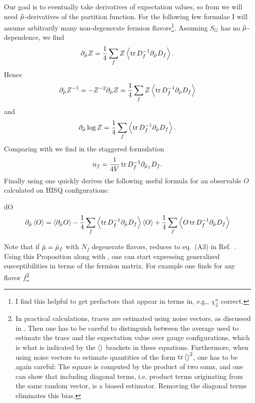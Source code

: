 Our goal is to eventually take derivatives of expectation values, so from
 we will need $\hat{\mu}$-derivatives of the partition 
function. For the following few formulae 
I will assume arbitrarily many non-degenerate
fermion flavors\footnote{I find this helpful to get prefactors that appear
in terms in, e.g., $\chi_2^u$ correct.}. Assuming $S_G$ has no 
$\hat{\mu}$-dependence, we find
\begin{equation}
  \partial_{\muh}Z = \frac{1}{4}\sum_f 
                      Z\ev{\tr D_f^{-1}\partial_{\muh}D_f}.
\end{equation}
Hence 
\begin{equation}\label{eq:dZinv}
  \partial_{\muh}Z^{-1} = -Z^{-2}\partial_{\muh}Z
                        =\frac{1}{4}\sum_fZ\ev{\tr D_f^{-1}\partial_{\muh}D_f}
\end{equation}
and
\begin{equation}\label{eq:dlogZ}
  \partial_{\muh}\log Z=\frac{1}{4}\sum_f\ev{\tr D_f^{-1}\partial_{\muh}D_f}.
\end{equation}
Comparing  with  we find in
the staggered formulation
\begin{equation}
  n_f=\frac{1}{4V}\tr D_f^{-1}\partial_{\hat{\mu}_f}D_f.
\end{equation} 
Finally using  one quickly derives the following useful formula
for an observable $O$ calculated on HISQ configurations:
\begin{proposition}{}{dO}
\begin{equation*} \partial_{\muh}\ev{O}
       =   \ev{\partial_{\muh}O}
        -\frac{1}{4}\sum_f\ev{\tr D_f^{-1}\partial_{\muh}D_f}\ev{O}
         +\frac{1}{4}\sum_f\ev{O\tr D_f^{-1}\partial_{\muh}D_f}
\end{equation*}
\end{proposition} 
Note that if $\hat{\mu}=\hat{\mu}_f$ with $N_f$ degenerate flavors, 
 reduces to eq.~(A3)
in Ref.~\cite{allton_thermodynamics_2005}. Using this Proposition along
with , one 
can start expressing generalized susceptibilities in terms of the fermion
matrix. For example one finds for any flavor $f$\footnote{In practical
calculations, traces are estimated using noise vectors, as discussed in
. Then one has to be careful to distinguish between the
average used to estimate the trace and the expectation value over gauge
configurations, which is what is indicated by the $\ev{}$ brackets in these
equations. Furthermore, when using noise vectors to estimate quantities of the
form $\tr\ev{}^2$, one has to be again careful: The square is computed by the
product of two sums, and one can show that including diagonal terms, i.e.
product terms originating from the same random vector, is a biased estimator.
Removing the diagonal terms eliminates this bias.}
